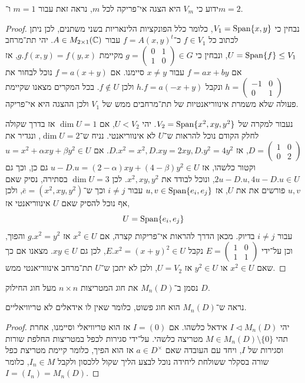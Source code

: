 \subquestion{}
ידוע כי $V_m$ היא הצגה אי־פריקה לכל $m$, נראה זאת עבור $m = 1$ ו־$m = 2$.
\begin{proof}
	נבחין כי $V_1 = \operatorname{Span}\{ x, y \}$, כלומר כלל הפונקציות הלינאריות בשני משתנים, לכן ניתן לכתוב כל $f \in V_1$ כ־$f = A {(x, y)}^t$ עבור $A \in M_{2 \times 1}(\mathbb{C})$.
	יהי תת־מרחב $U = \operatorname{Span}\{ f \} \le V_1$, ונבחין כי $g = (\begin{smallmatrix} 0 & 1 \\ 1 & 0 \end{smallmatrix}) \in G$ מקיימת $g . f(x, y) = f(y, x)$, אז אם $f = a x + b y$ עבור $x \ne y$ סיימנו.
	אם $f = a (x + y)$ נוכל לבחור את $h = (\begin{smallmatrix} -1 & 0 \\ 0 & 1 \end{smallmatrix})$ ונקבל $h . f = a(-x + y)$ ולכן $f \notin U$.
	בכל המקרים מצאנו שקיימת פעולה שלא משמרת אינווריאנטיות של תת־מרחבים ממש של $V_1$ ולכן ההצגה היא אי־פריקה.

	נעבור למקרה של $V_2 = \operatorname{Span}\{ x^2, x y, y^2 \}$.
	יהי $U < V_2$, אם $\dim U = 1$ אז בדרך שקולה לחלק הקודם נוכל להראות ש־$U$ לא אינווריאנטי.
	נניח ש־$\dim U = 2$, ונגדיר את $D = (\begin{smallmatrix} 1 & 0 \\ 0 & 2 \end{smallmatrix})$, אז $D . x^2 = x^2, D . x y = 2 x y, D . y^2 = 4 y^2$.
	אם $u = x^2 + \alpha x y + \beta y^2 \in U$ וקטור כלשהו, אז $u - D . u = (2 - \alpha) x y + (4 - \beta) y^2 \in U$ גם כן, וכך גם $2 u - D . u, 4 u - D . u \in U$, ונוכל לבודד את $x^2, x y, y^2$.
	לכן $\dim U = 3$ בסתירה, נסיק שאם $u, v$ פורשים את את $U$, אז $u, v \in \operatorname{Span}\{ e_i, e_j \}$ עבור $i \ne j$ וכך ש־$\bar{e} = (x^2, x y, y^2)$, ולכן אף נוכל להסיק שאם $U$ אינווריאנטי אז,
	\[
		U
		= \operatorname{Span}\{ e_i, e_j \}
	\]
	עבור $i \ne j$ בדיוק.
	מכאן הדרך להראות אי־פריקות קצרה, אם $x^2 \in U$ אז $g . x^2 = y^2$ והפוך, וכן על־ידי $E = (\begin{smallmatrix} 1 & 0 \\ 1 & 1 \end{smallmatrix})$ נקבל $E . x^2 = {(x + y)}^2 \in U$, לכן גם $x y \in U$.
	מצאנו אם כך שאם $x^2 \in U$ או $y^2 \in U$ אז $U = V_2$, ולכן לא יתכן ש־$U$ תת־מרחב אינווריאנטי ממש.
\end{proof}

\question{}
נסמן ב־$M_n(D)$ את חוג המטריצות $n \times n$ מעל חוג החילוק $D$.

\subquestion{}
נראה ש־$M_n(D)$ הוא חוג פשוט, כלומר שאין לו אידאלים לא טריוויאליים.
\begin{proof}
	יהי $I \triangleleft M_n(D)$ אידאל כלשהו. אם $I = (0)$ אז הוא טריוויאלי וסיימנו, אחרת תהי $M \in M_n(D) \setminus \{ 0 \}$ מטריצה כלשהי.
	על־ידי סגירות לכפל במטריצות החלפת שורות וסגירות של $I$, ויחד עם העובדה שאם $a \in D^\times$ אז הוא הפיך, כלומר קיימת מטריצת כפל שורה בסקלר ששולחת ליחידה נוכל לבצע הליך שקול ללכסון ולקבל $I_n \in M$,
	כלומר $I = (I_n) = M_n(D)$.
\end{proof}

